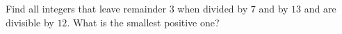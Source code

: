 Find all integers that leave remainder $3$ when divided by $7$ and by $13$ and are divisible by $12$. What is the smallest positive one?
